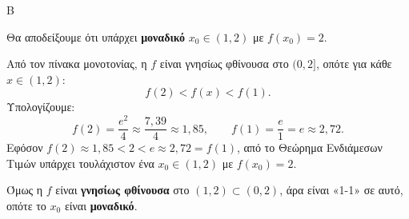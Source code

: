 \begin{thema}{Β}
\begin{erwthma}
\item Θα αποδείξουμε ότι υπάρχει \textbf{μοναδικό} $x_0 \in (1,2)$ με $f(x_0) = 2$.

Από τον πίνακα μονοτονίας, η $f$ είναι γνησίως φθίνουσα στο $(0, 2]$, οπότε για κάθε $x \in (1, 2)$:
\[
f(2) < f(x) < f(1).
\]
Υπολογίζουμε:
\[
f(2) = \frac{e^2}{4} \approx \frac{7{,}39}{4} \approx 1{,}85, \qquad f(1) = \frac{e}{1} = e \approx 2{,}72.
\]
Εφόσον $f(2) \approx 1{,}85 < 2 < e \approx 2{,}72 = f(1)$, από το Θεώρημα Ενδιάμεσων Τιμών υπάρχει τουλάχιστον ένα $x_0 \in (1,2)$ με $f(x_0) = 2$.

Όμως η $f$ είναι \textbf{γνησίως φθίνουσα} στο $(1,2) \subset (0,2)$, άρα είναι «1-1» σε αυτό, οπότε το $x_0$ είναι \textbf{μοναδικό}.

\end{erwthma}
\end{thema}
